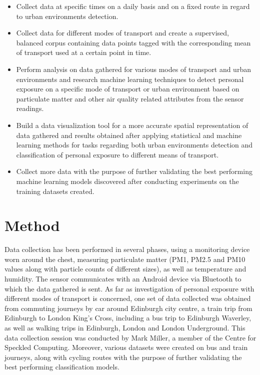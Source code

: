 \documentclass[bsc,frontabs,twoside,singlespacing, parskip,deptreport]{infthesis}     %
\begin{document}
\begin{itemize}
\item Collect data at specific times on a daily basis and on a fixed route in regard to urban environments detection.
\item Collect data for different modes of transport and create a supervised, balanced corpus containing data points tagged with the corresponding mean of transport used at a certain point in time.
\item Perform analysis on data gathered for various modes of transport and urban environments and research machine learning techniques to detect personal exposure on a specific mode of transport or urban environment based on particulate matter and other air quality related attributes from the sensor readings.
\item Build a data visualization tool for a more accurate spatial representation of data gathered and results obtained after applying statistical and machine learning methods for tasks regarding both urban environments detection and classification of personal exposure to different means of transport.
\item Collect more data with the purpose of further validating the best performing machine learning models discovered after conducting experiments on the training datasets created.
\end{itemize}

\section{Method}

Data collection has been performed in several phases, using a monitoring device worn around the chest, measuring particulate matter (PM1, PM2.5 and PM10 values along with particle counts of different sizes), as well as temperature and humidity. The sensor communicates with an Android device via Bluetooth to which the data gathered is sent. As far as investigation of personal exposure with different modes of transport is concerned, one set of data collected was obtained from commuting journeys by car around Edinburgh city centre, a train trip from Edinburgh to London King's Cross, including a bus trip to Edinburgh Waverley, as well as walking trips in Edinburgh, London and London Underground. This data collection session was conducted by Mark Miller, a member of the Centre for Speckled Computing. Moreover, various datasets were created on bus and train journeys, along with cycling routes with the purpose of further validating the best performing classification models.
\end{document}

